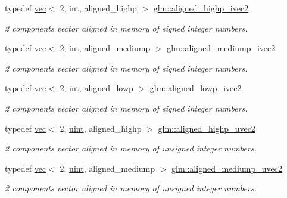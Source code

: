 \begin{DoxyCompactItemize}
typedef \mbox{\hyperlink{structglm_1_1vec}{vec}}$<$ 2, int, aligned\+\_\+highp $>$ \mbox{\hyperlink{group__gtc__type__aligned_ga34105808a80ef5dabd7807997dfef328}{glm\+::aligned\+\_\+highp\+\_\+ivec2}}
\begin{DoxyCompactList}\small\item\em 2 components vector aligned in memory of signed integer numbers. \end{DoxyCompactList}\item 
typedef \mbox{\hyperlink{structglm_1_1vec}{vec}}$<$ 2, int, aligned\+\_\+mediump $>$ \mbox{\hyperlink{group__gtc__type__aligned_ga21c35fcb068f6d38f3aaed915c3e3b5a}{glm\+::aligned\+\_\+mediump\+\_\+ivec2}}
\begin{DoxyCompactList}\small\item\em 2 components vector aligned in memory of signed integer numbers. \end{DoxyCompactList}\item 
typedef \mbox{\hyperlink{structglm_1_1vec}{vec}}$<$ 2, int, aligned\+\_\+lowp $>$ \mbox{\hyperlink{group__gtc__type__aligned_ga186cb1ada403d7a52411f64c83295486}{glm\+::aligned\+\_\+lowp\+\_\+ivec2}}
\begin{DoxyCompactList}\small\item\em 2 components vector aligned in memory of signed integer numbers. \end{DoxyCompactList}\item 
typedef \mbox{\hyperlink{structglm_1_1vec}{vec}}$<$ 2, \mbox{\hyperlink{group__core__precision_ga4fd29415871152bfb5abd588334147c8}{uint}}, aligned\+\_\+highp $>$ \mbox{\hyperlink{group__gtc__type__aligned_ga4497b2f3be81910c7a1bf632b51ac9a6}{glm\+::aligned\+\_\+highp\+\_\+uvec2}}
\begin{DoxyCompactList}\small\item\em 2 components vector aligned in memory of unsigned integer numbers. \end{DoxyCompactList}\item 
typedef \mbox{\hyperlink{structglm_1_1vec}{vec}}$<$ 2, \mbox{\hyperlink{group__core__precision_ga4fd29415871152bfb5abd588334147c8}{uint}}, aligned\+\_\+mediump $>$ \mbox{\hyperlink{group__gtc__type__aligned_gacb673fdb5622c457d9f8ec669bc32842}{glm\+::aligned\+\_\+mediump\+\_\+uvec2}}
\begin{DoxyCompactList}\small\item\em 2 components vector aligned in memory of unsigned integer numbers. \end{DoxyCompactList}\item 

\end{DoxyCompactItemize}
